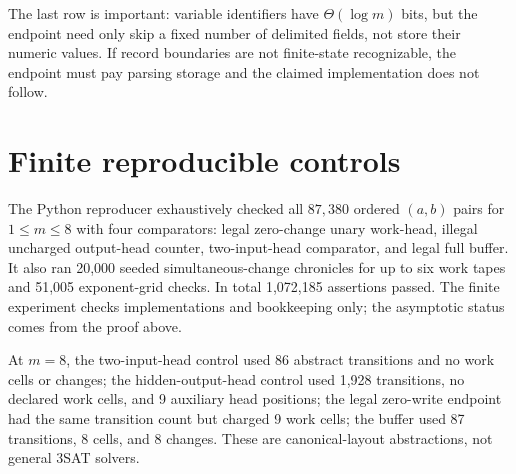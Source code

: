 \documentclass[11pt]{article}
\begin{document}
The last row is important: variable identifiers have $\Theta(\log m)$ bits,
but the endpoint need only skip a fixed number of delimited fields, not store
their numeric values.  If record boundaries are not finite-state recognizable,
the endpoint must pay parsing storage and the claimed implementation does not
follow.

\section{Finite reproducible controls}
The Python reproducer exhaustively checked all $87{,}380$ ordered $(a,b)$ pairs
for $1\le m\le8$ with four comparators: legal zero-change unary work-head,
illegal uncharged output-head counter, two-input-head comparator, and legal
full buffer.  It also ran 20,000 seeded simultaneous-change chronicles for up
to six work tapes and 51,005 exponent-grid checks.  In total 1,072,185
assertions passed.  The finite experiment checks implementations and
bookkeeping only; the asymptotic status comes from the proof above.

At $m=8$, the two-input-head control used 86 abstract transitions and no work
cells or changes; the hidden-output-head control used 1,928 transitions, no
declared work cells, and 9 auxiliary head positions; the legal zero-write
endpoint had the same transition count but charged 9 work cells; the buffer
used 87 transitions, 8 cells, and 8 changes.  These are canonical-layout
abstractions, not general 3SAT solvers.
\end{document}
